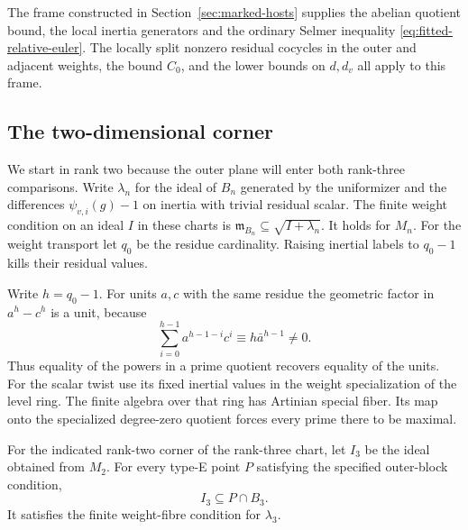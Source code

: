 The frame constructed in Section~\ref{sec:marked-hosts}
supplies the abelian quotient bound, the local inertia generators
and the ordinary Selmer inequality \eqref{eq:fitted-relative-euler}.
The locally split nonzero residual cocycles in the outer and
adjacent weights, the bound \(C_0\), and the lower bounds on
\(d,d_v\) all apply to this frame.

\subsection{The two-dimensional corner}

We start in rank two because the outer plane will enter both rank-three comparisons.
Write \(\lambda_n\) for the ideal of \(B_n\) generated by the
uniformizer and the differences \(\psi_{v,i}(g)-1\) on inertia
with trivial residual scalar. The finite weight condition on
an ideal \(I\) in these charts is
\(\mathfrak m_{B_n}\subseteq\sqrt{I+\lambda_n}\).
It holds for \(M_n\). For the weight transport let \(q_0\)
be the residue cardinality. Raising inertial labels to
\(q_0-1\) kills their residual values.

Write \(h=q_0-1\). For units \(a,c\) with the same residue the geometric factor in \(a^h-c^h\) is a unit, because
\[
 \sum_{i=0}^{h-1}a^{h-1-i}c^i\equiv h\bar a^{h-1}\ne0 .
\] Thus equality of the powers in a
prime quotient recovers equality of the units. For the
scalar twist use its fixed inertial values in the weight
specialization of the level ring. The finite algebra over
that ring has Artinian special fiber. Its map onto the
specialized degree-zero quotient forces every prime there
to be maximal.

\begin{lemma}
\label{lem:rank-three-outer-corner}
For the indicated rank-two corner of the rank-three chart, let \(I_3\) be the ideal obtained from \(M_2\). For every type-E point
\(P\) satisfying the specified outer-block condition,
\[
                       I_3\subseteq P\cap B_3 .
\] It satisfies the finite weight-fibre condition for
\(\lambda_3\).
\end{lemma}


